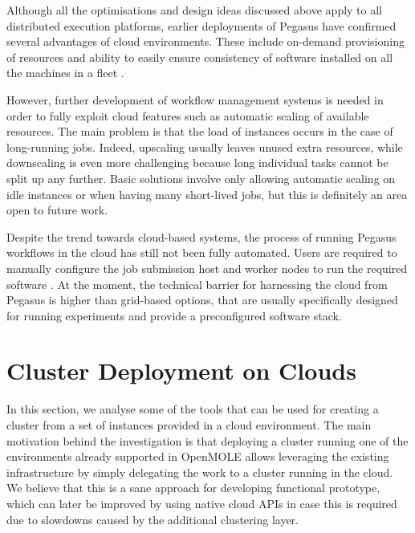 Although all the optimisations and design ideas discussed above apply to all distributed execution platforms, earlier deployments of Pegasus have confirmed several advantages of cloud environments. These include on-demand provisioning of resources and ability to easily ensure consistency of software installed on all the machines in a fleet \cite{Deelman2016}. 

However, further development of workflow management systems is needed in order to fully exploit cloud features such as automatic scaling of available resources. The main problem is that the load of instances occurs in the case of long-running jobs. Indeed, upscaling usually leaves unused extra resources, while downscaling is even more challenging because long individual tasks cannot be split up any further. Basic solutions involve only allowing automatic scaling on idle instances or when having many short-lived jobs, but this is definitely an area open to future work.

Despite the trend towards cloud-based systems, the process of running Pegasus workflows in the cloud has still not been fully automated. Users are required to manually configure the job submission host and worker nodes to run the required software \cite{PegasusTutorial}. At the moment, the technical barrier for harnessing the cloud from Pegasus is higher than grid-based options, that are usually specifically designed for running experiments and provide a preconfigured software stack.

\section{Cluster Deployment on Clouds}

In this section, we analyse some of the tools that can be used for creating a cluster from a set of instances provided in a cloud environment. The main motivation behind the investigation is that deploying a cluster running one of the environments already supported in OpenMOLE allows leveraging the existing infrastructure by simply delegating the work to a cluster running in the cloud. We believe that this is a sane approach for developing functional prototype, which can later be improved by using native cloud APIs in case this is required due to slowdowns caused by the additional clustering layer.

